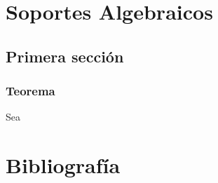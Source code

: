 \documentclass[12pt,a4paper,]{book}
\def\ifdoblecara{} %
\def\ifprincipal{} %
\def\ifcitapandoc{} %
\let\ifcitapandoc\undefined %
\numberwithin{dummy}{section}
\theoremstyle{ocrenumbox}
\theoremstyle{ocrenumbox}
\theoremstyle{ocrenumbox}
\theoremstyle{ocrenumbox}
\theoremstyle{ocrenum}
\begin{document}
\FloatBarrier

\appendix

\ifdefined\ifprincipal
\else
\setlength{\parindent}{1em}
\pagestyle{fancy}
\setcounter{tocdepth}{4}
\tableofcontents

\fi

\ifdefined\ifdoblecara
\fancyhead{}{}
\fancyhead[LE,RO]{\scriptsize\rightmark}
\fancyfoot[LO,RE]{\scriptsize\slshape \leftmark}
\fancyfoot[C]{}
\fancyfoot[LE,RO]{\footnotesize\thepage}
\else
\fancyhead{}{}
\fancyhead[RO]{\scriptsize\rightmark}
\fancyfoot[LO]{\scriptsize\slshape \leftmark}
\fancyfoot[C]{}
\fancyfoot[RO]{\footnotesize\thepage}
\fi

\renewcommand{\headrulewidth}{0.4pt}
\renewcommand{\footrulewidth}{0.4pt}

\hypertarget{soportes-algebraicos}{%
\chapter{Soportes Algebraicos}\label{soportes-algebraicos}}

\hypertarget{primera-secciuxf3n-1}{%
\section{Primera sección}\label{primera-secciuxf3n-1}}

\hypertarget{teorema}{%
\subsection{Teorema}\label{teorema}}

Sea

\FloatBarrier
\cleardoublepage

\ifdefined\ifdoblecara
  \fancyhead[LE,RO]{}
  \fancyfoot[LO,RE]{}
\else
  \fancyhead[RO]{}
  \fancyfoot[LO]{}
\fi

\ifdefined\ifcitapandoc

\hypertarget{bibliografuxeda}{%
\chapter*{Bibliografía}\label{bibliografuxeda}}

\else

\nocite{RStudio,R-knitr,R-rmarkdown,knitr2015,knitr2014,rmarkdown2018,
rmarkdown2020}

\fi




\end{document}
